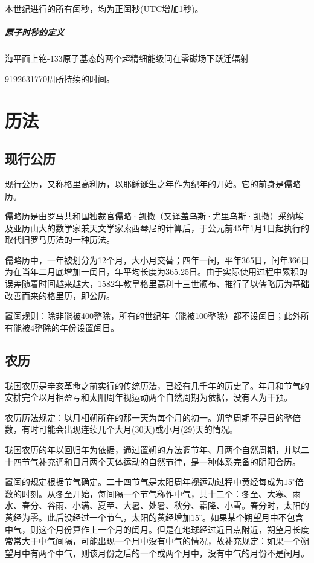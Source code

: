 本世纪进行的所有闰秒，均为正闰秒(UTC增加1秒)。

\subparagraph{原子时秒的定义}海平面上铯-133原子基态的两个超精细能级间在零磁场下跃迁辐射

9192631770周所持续的时间。

\section{历法}
\subsection{现行公历}
现行公历，又称格里高利历，以耶稣诞生之年作为纪年的开始。它的前身是儒略历。

儒略历是由罗马共和国独裁官儒略·凯撒（又译盖乌斯·尤里乌斯·凯撒）采纳埃及亚历山大的数学家兼天文学家索西琴尼的计算后，于公元前45年1月1日起执行的取代旧罗马历法的一种历法。

儒略历中，一年被划分为12个月，大小月交替；四年一闰，平年365日，闰年366日为在当年二月底增加一闰日，年平均长度为365.25日。由于实际使用过程中累积的误差随着时间越来越大，1582年教皇格里高利十三世颁布、推行了以儒略历为基础改善而来的格里历，即公历。

置闰规则：除非能被400整除，所有的世纪年（能被100整除）都不设闰日；此外所有能被4整除的年份设置闰日。
\subsection{农历}
我国农历是辛亥革命之前实行的传统历法，已经有几千年的历史了。年月和节气的安排完全以月相盈亏和太阳周年视运动两个自然周期为依据，没有人为干预。

农历历法规定：以月相朔所在的那一天为每个月的初一。朔望周期不是日的整倍数，有时可能会出现连续几个大月(30天)或小月(29)天的情况。

我国农历的年以回归年为依据，通过置朔的方法调节年、月两个自然周期，并以二十四节气补充调和日月两个天体运动的自然节律，是一种体系完备的阴阳合历。

置闰的规定根据节气确定。二十四节气是太阳周年视运动过程中黄经每成为$15^\circ$倍数的时刻。从冬至开始，每间隔一个节气称作中气，共十二个：冬至、大寒、雨水、春分、谷雨、小满、夏至、大暑、处暑、秋分、霜降、小雪。春分时，太阳的黄经为零。此后没经过一个节气，太阳的黄经增加$15^\circ$。如果某个朔望月中不包含中气，则这个月份算作上一个月的闰月。但是在地球经过近日点附近，朔望月长度常常大于中气间隔，可能出现一个月中没有中气的情况，故补充规定：如果一个朔望月中有两个中气，则该月份之后的一个或两个月中，没有中气的月份不是闰月。

